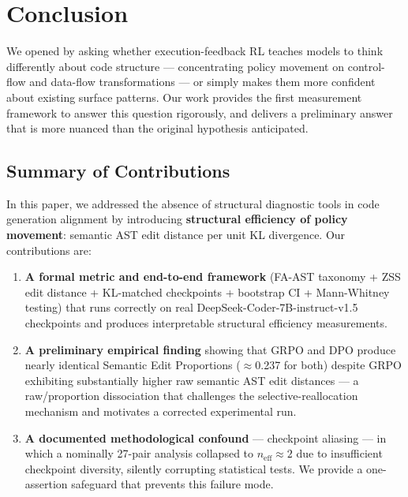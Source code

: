 \section{Conclusion}
\label{sec:conclusion}

We opened by asking whether execution-feedback RL teaches models to think
differently about code structure --- concentrating policy movement on control-flow
and data-flow transformations --- or simply makes them more confident about
existing surface patterns. Our work provides the first measurement framework
to answer this question rigorously, and delivers a preliminary answer that is
more nuanced than the original hypothesis anticipated.

\subsection{Summary of Contributions}

In this paper, we addressed the absence of structural diagnostic tools in code
generation alignment by introducing \textbf{structural efficiency of policy movement}:
semantic AST edit distance per unit KL divergence. Our contributions are:

\begin{enumerate}
  \item \textbf{A formal metric and end-to-end framework} (FA-AST taxonomy + ZSS edit
    distance + KL-matched checkpoints + bootstrap CI + Mann-Whitney testing)
    that runs correctly on real DeepSeek-Coder-7B-instruct-v1.5 checkpoints and
    produces interpretable structural efficiency measurements.

  \item \textbf{A preliminary empirical finding} showing that GRPO and DPO produce
    nearly identical Semantic Edit Proportions ($\approx$0.237 for both) despite GRPO
    exhibiting substantially higher raw semantic AST edit distances --- a
    raw/proportion dissociation that challenges the selective-reallocation
    mechanism and motivates a corrected experimental run.

  \item \textbf{A documented methodological confound} --- checkpoint aliasing --- in which
    a nominally 27-pair analysis collapsed to $n_\text{eff} \approx 2$ due to
    insufficient checkpoint diversity, silently corrupting statistical tests.
    We provide a one-assertion safeguard that prevents this failure mode.
\end{enumerate}


